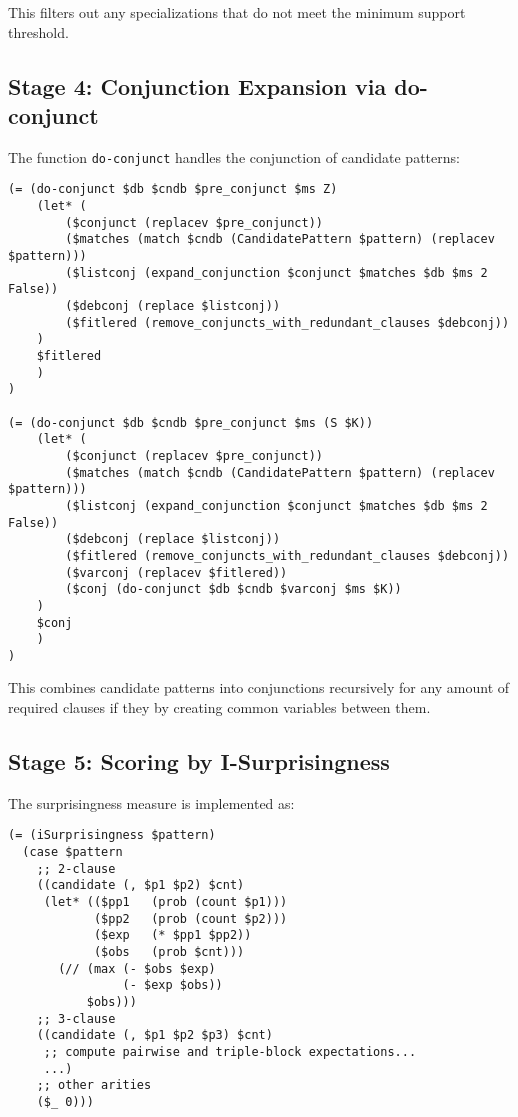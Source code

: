\documentclass{article}
\begin{document}
This filters out any specializations that do not meet the minimum support threshold.

\subsection{Stage 4: Conjunction Expansion via do-conjunct}

The function \texttt{do-conjunct} handles the conjunction of candidate patterns:

\begin{verbatim}
(= (do-conjunct $db $cndb $pre_conjunct $ms Z)
    (let* (
        ($conjunct (replacev $pre_conjunct))
        ($matches (match $cndb (CandidatePattern $pattern) (replacev $pattern)))
        ($listconj (expand_conjunction $conjunct $matches $db $ms 2 False))
        ($debconj (replace $listconj))
        ($fitlered (remove_conjuncts_with_redundant_clauses $debconj))
    )
    $fitlered
    )
)

(= (do-conjunct $db $cndb $pre_conjunct $ms (S $K))
    (let* (
        ($conjunct (replacev $pre_conjunct))
        ($matches (match $cndb (CandidatePattern $pattern) (replacev $pattern)))
        ($listconj (expand_conjunction $conjunct $matches $db $ms 2 False))
        ($debconj (replace $listconj))
        ($fitlered (remove_conjuncts_with_redundant_clauses $debconj))
        ($varconj (replacev $fitlered))
        ($conj (do-conjunct $db $cndb $varconj $ms $K))    
    )
    $conj
    )
)
\end{verbatim}


This combines candidate patterns into conjunctions recursively for any amount of required clauses if they by creating common variables between them.

\subsection{Stage 5: Scoring by I-Surprisingness}

The surprisingness measure is implemented as:

\begin{verbatim}
(= (iSurprisingness $pattern)
  (case $pattern
    ;; 2-clause
    ((candidate (, $p1 $p2) $cnt)
     (let* (($pp1   (prob (count $p1)))
            ($pp2   (prob (count $p2)))
            ($exp   (* $pp1 $pp2))
            ($obs   (prob $cnt)))
       (// (max (- $obs $exp)
                (- $exp $obs))
           $obs)))
    ;; 3-clause
    ((candidate (, $p1 $p2 $p3) $cnt)
     ;; compute pairwise and triple-block expectations...
     ...)
    ;; other arities
    ($_ 0)))
\end{verbatim}
\end{document}
